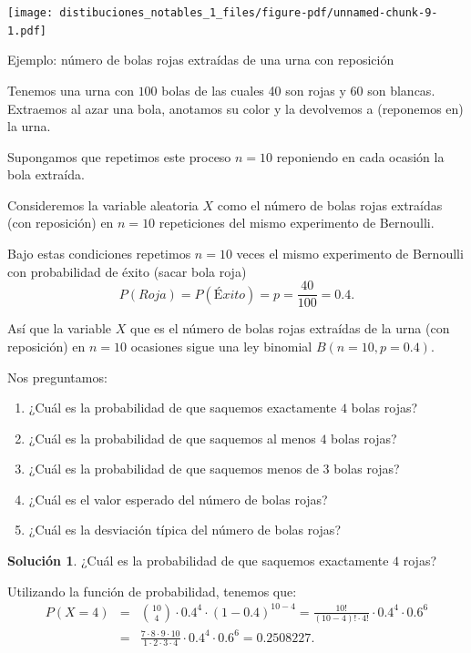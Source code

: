 \documentclass[
  letterpaper,
  DIV=11,
  numbers=noendperiod]{scrreprt}
\providecommand{\tightlist}{%
  \setlength{\itemsep}{0pt}\setlength{\parskip}{0pt}}\usepackage{longtable,booktabs,array}
\begin{document}
\begin{center}
\texttt{[image: distibuciones\_notables\_1\_files/figure-pdf/unnamed-chunk-9-1.pdf]}
\end{center}

Ejemplo: número de bolas rojas extraídas de una urna con reposición

Tenemos una urna con \(100\) bolas de las cuales 40 son rojas y 60 son
blancas. Extraemos al azar una bola, anotamos su color y la devolvemos a
(reponemos en) la urna.

Supongamos que repetimos este proceso \(n=10\) reponiendo en cada
ocasión la bola extraída.

Consideremos la variable aleatoria \(X\) como el número de bolas rojas
extraídas (con reposición) en \(n=10\) repeticiones del mismo
experimento de Bernoulli.

Bajo estas condiciones repetimos \(n=10\) veces el mismo experimento de
Bernoulli con probabilidad de éxito (sacar bola roja)
\[P(Roja)=P(Éxito)=p=\frac{40}{100}=0.4.\]

Así que la variable \(X\) que es el número de bolas rojas extraídas de
la urna (con reposición) en \(n=10\) ocasiones sigue una ley binomial
\(B(n=10,p=0.4).\)

Nos preguntamos:

\begin{enumerate}
\def\labelenumi{\arabic{enumi}.}
\tightlist
\item
  ¿Cuál es la probabilidad de que saquemos exactamente \(4\) bolas
  rojas?
\item
  ¿Cuál es la probabilidad de que saquemos al menos \(4\) bolas rojas?
\item
  ¿Cuál es la probabilidad de que saquemos menos de \(3\) bolas rojas?
\item
  ¿Cuál es el valor esperado del número de bolas rojas?
\item
  ¿Cuál es la desviación típica del número de bolas rojas?
\end{enumerate}

\textbf{Solución 1}. ¿Cuál es la probabilidad de que saquemos
exactamente \(4\) rojas?

Utilizando la función de probabilidad, tenemos que: \begin{eqnarray*}
P(X=4)&=&{10\choose 4}\cdot 0.4^4\cdot (1-0.4)^{10-4}
= \frac{10!}{(10-4)!\cdot 4!}\cdot 0.4^4\cdot 0.6^6\\
&=& \frac{7\cdot 8\cdot 9\cdot 10}{1\cdot 2\cdot 3\cdot 4}\cdot 0.4^4\cdot 0.6^6=0.2508227.
\end{eqnarray*}
\end{document}
